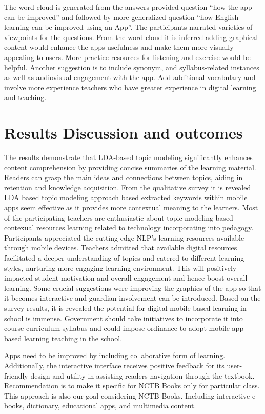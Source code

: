 \documentclass[sn-mathphys,Numbered]{sn-jnl}%
\theoremstyle{thmstyleone}%
\theoremstyle{thmstyletwo}%
\theoremstyle{thmstylethree}%
\begin{document}
The word cloud is generated from the answers provided question ``how the
app can be improved'' and followed by more generalized question ``how
English learning can be improved using an App''. The participants
narrated varieties of viewpoints for the questions. From the word cloud
it is inferred adding graphical content would enhance the
apps\textquotesingle{} usefulness and make them more visually appealing
to users. More practice resources for listening and exercise would be
helpful. Another suggestion is to include synonym, and syllabus-related
instances as well as audiovisual engagement with the app. Add additional
vocabulary and involve more experience teachers who have greater
experience in digital learning and teaching.

\section{Results Discussion and outcomes}\label{res_dis}

The results demonstrate that LDA-based topic modeling significantly
enhances content comprehension by providing concise summaries of the
learning material. Readers can grasp the main ideas and connections
between topics, aiding in retention and knowledge acquisition. From the
qualitative survey it is revealed LDA based topic modeling approach
based extracted keywords within mobile apps seem effective as it
provides more contextual meaning to the learners. Most of the
participating teachers are enthusiastic about topic modeling based
contexual resources learning related to technology incorporating into
pedagogy. Participants appreciated the cutting edge NLP's learning
resources available through mobile devices. Teachers admitted that
available digital resources facilitated a deeper understanding of topics
and catered to different learning styles, nurturing more engaging
learning environment. This will positively impacted student motivation
and overall engagement and hence boost overall learning. Some crucial
suggestions were improving the graphics of the app so that it becomes
interactive and guardian involvement can be introduced. Based on the
survey results, it is revealed the potential for digital mobile-based
learning in school is immense. Government should take initiatives to
incorporate it into course curriculum syllabus and could impose
ordinance to adopt mobile app based learning teaching in the school.

Apps need to be improved by including collaborative form of learning.
Additionally, the interactive interface receives positive feedback for
its user-friendly design and utility in assisting
readers\textquotesingle{} navigation through the textbook.
Recommendation is to make it specific for NCTB Books only for particular
class. This approach is also our goal considering NCTB Books. Including
interactive e-books, dictionary, educational apps, and multimedia
content.
\end{document}

